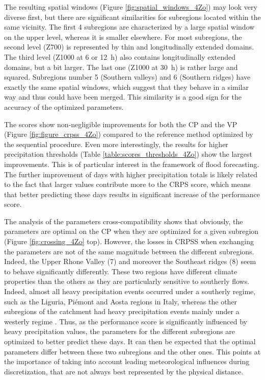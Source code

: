 \documentclass[review]{elsarticle}
\begin{document}
The resulting spatial windows (Figure \ref{fig:spatial_windows_4Zo}) may look very diverse first, but there are significant similarities for subregions located within the same vicinity. The first 4 subregions are characterized by a large spatial window on the upper level, whereas it is smaller elsewhere. For most subregions, the second level (Z700) is represented by thin and longitudinally extended domains. The third level (Z1000 at 6 or 12~h) also contains longitudinally extended domains, but a bit larger. The last one (Z1000 at 30~h) is rather large and squared. Subregions number 5 (Southern valleys) and 6 (Southern ridges) have exactly the same spatial windows, which suggest that they behave in a similar way and thus could have been merged. This similarity is a good sign for the accuracy of the optimized parameters.

The scores show non-negligible improvements for both the CP and the VP (Figure \ref{fig:figure_crpss_4Zo}) compared to the reference method optimized by the sequential procedure. Even more interestingly, the results for higher precipitation thresholds (Table \ref{table:scores_thresholds_4Zo}) show the largest improvements. This is of particular interest in the framework of flood forecasting. The further improvement of days with higher precipitation totals is likely related to the fact that larger values contribute more to the CRPS score, which means that better predicting these days results in significant increase of the performance score.

The analysis of the parameters cross-compatibility shows that obviously, the parameters are optimal on the CP when they are optimized for a given subregion (Figure \ref{fig:crossing_4Zo} top). However, the losses in CRPSS when exchanging the parameters are not of the same magnitude between the different subregions. Indeed, the Upper Rhone Valley (7) and moreover the Southeast ridges (8) seem to behave significantly differently. These two regions have different climate properties than the others as they are particularly sensitive to southerly flows. Indeed, almost all heavy precipitation events occurred under a southerly regime, such as the Liguria, Piémont and Aosta regions in Italy, whereas the other subregions of the catchment had heavy precipitation events mainly under a westerly regime \citep{Horton2012}. Thus, as the performance score is significantly influenced by heavy precipitation values, the parameters for the different subregions are optimized to better predict these days. It can then be expected that the optimal parameters differ between these two subregions and the other ones. This points at the importance of taking into account leading meteorological influences during discretization, that are not always best represented by the physical distance. 
\end{document}

